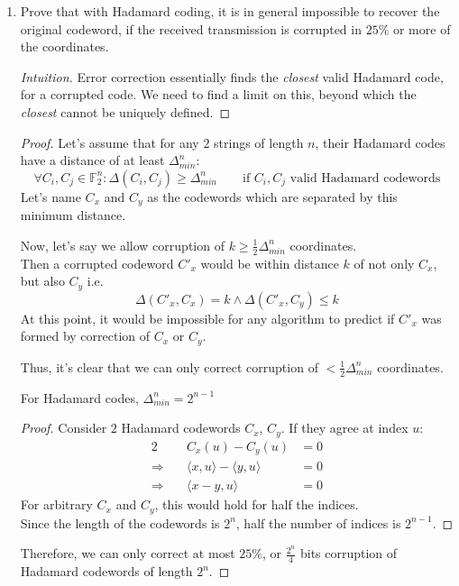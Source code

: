 \documentclass[usletter]{article}
\newcommand {\namedset}[1]     {\ensuremath{\mathbb{#1}}}
\newcommand {\field}[2] {\ensuremath{\namedset{F}_{#1}^{#2}}}
\begin{document}
\begin{enumerate}[labelsep=2.5em, label=\textbf{\arabic{enumi}}]
  \item Prove that with Hadamard coding, it is in general impossible to recover
        the original codeword, if the received transmission is corrupted in
        $25\%$ or more of the coordinates.
  \begin{proof}[Intuition]
    Error correction essentially finds the \textit{closest} valid Hadamard code,
    for a corrupted code. We need to find a limit on this, beyond which the
    \textit{closest} cannot be uniquely defined.
  \end{proof}
  \begin{proof}
    Let's assume that for any $2$ strings of length $n$, their Hadamard codes
    have a distance of at least $\Delta^n_{min}$:
    $$
    \forall C_i, C_j \in \field{2}{n} : \Delta(C_i, C_j) \geq \Delta^n_{min}
    \qquad \text{if } C_i, C_j \text{ valid Hadamard codewords}
    $$
    Let's name $C_x$ and $C_y$ as the codewords which are separated by this
    minimum distance.

    Now, let's say we allow corruption of $k \geq \frac{1}{2}\Delta^n_{min}$
    coordinates. \\
    Then a corrupted codeword $C'_x$ would be within distance $k$ of not only
    $C_x$, but also $C_y$ i.e.
    $$
    \Delta(C'_x, C_x) = k \wedge \Delta(C'_x, C_y) \leq k
    $$
    At this point, it would be impossible for any algorithm to predict if $C'_x$
    was formed by correction of $C_x$ or $C_y$.

    Thus, it's clear that we can only correct corruption of
    $< \frac{1}{2}\Delta^n_{min}$ coordinates. \\

    \begin{claim}
      For Hadamard codes, $\Delta^n_{min} = 2^{n-1}$
    \end{claim}
    \begin{proof}
      Consider $2$ Hadamard codewords $C_x$, $C_y$. If they agree at index $u$:
      \begin{alignat*}{2}
          & \quad C_x(u) - C_y(u) &= 0 \\
        \Rightarrow & \quad \langle x, u \rangle - \langle y, u \rangle &= 0 \\
        \Rightarrow & \quad \langle x - y, u \rangle &= 0
      \end{alignat*}
      For arbitrary $C_x$ and $C_y$, this would hold for half the indices. \\
      Since the length of the codewords is $2^n$, half the number of indices is
      $2^{n-1}$.
    \end{proof}

    Therefore, we can only correct at most $25\%$, or $\frac{2^{n}}{4}$ bits
    corruption of Hadamard codewords of length $2^{n}$.
  \end{proof}

\end{enumerate}



\end{document}

